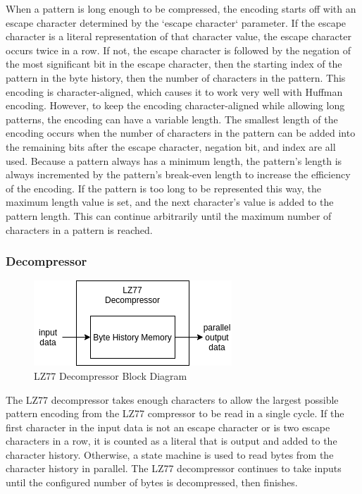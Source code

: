 \documentclass[doublespace,nopageskip]{VTthesis}
\begin{document}
When a pattern is long enough to be compressed, the encoding starts off with an escape character determined by the `escape character` parameter. If the escape character is a literal representation of that character value, the escape character occurs twice in a row. If not, the escape character is followed by the negation of the most significant bit in the escape character, then the starting index of the pattern in the byte history, then the number of characters in the pattern. This encoding is character-aligned, which causes it to work very well with Huffman encoding. However, to keep the encoding character-aligned while allowing long patterns, the encoding can have a variable length. The smallest length of the encoding occurs when the number of characters in the pattern can be added into the remaining bits after the escape character, negation bit, and index are all used. Because a pattern always has a minimum length, the pattern's length is always incremented by the pattern's break-even length to increase the efficiency of the encoding. If the pattern is too long to be represented this way, the maximum length value is set, and the next character's value is added to the pattern length. This can continue arbitrarily until the maximum number of characters in a pattern is reached. 

\subsubsection{Decompressor}\label{sss:lz77_decompressor_implementation}

\begin{figure}[htb]
	\centering
	\includegraphics[scale=1]{LZ77 Decompressor.png}
	\caption{LZ77 Decompressor Block Diagram}
	\label{fig:lz77_decompressor_block_diagram}
\end{figure}

The LZ77 decompressor takes enough characters to allow the largest possible pattern encoding from the LZ77 compressor to be read in a single cycle. If the first character in the input data is not an escape character or is two escape characters in a row, it is counted as a literal that is output and added to the character history. Otherwise, a state machine is used to read bytes from the character history in parallel. The LZ77 decompressor continues to take inputs until the configured number of bytes is decompressed, then finishes.
\end{document}
